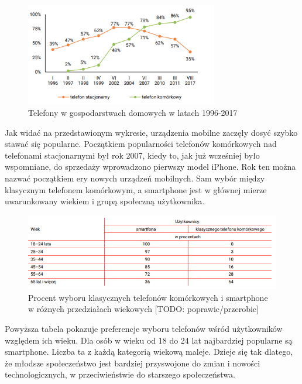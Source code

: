 \documentclass[a4paper,12pt,oneside]{book}
\begin{document}
	\newpage
	\begin{figure}[h]
		\centering
		\includegraphics[width=0.75\textwidth]{grafika/cbos_wykres}
		\caption{Telefony w gospodarstwach domowych w latach 1996-2017}
	\end{figure}

	Jak widać na przedstawionym wykresie, urządzenia mobilne zaczęły dosyć szybko stawać się popularne. Początkiem popularności telefonów komórkowych nad telefonami stacjonarnymi był rok 2007, kiedy to, jak już wcześniej było wspomniane, do sprzedaży wprowadzono pierwszy model iPhone. Rok ten można nazwać początkiem ery nowych urządzeń mobilnych. Sam wybór między klasycznym telefonem komórkowym, a smartphone jest w głównej mierze uwarunkowany wiekiem i grupą społeczną użytkownika.
	
	\begin{figure}[h]
		\centering
		\includegraphics[width=1\textwidth]{grafika/cbos_wykres2}
		\caption{Procent wyboru klasycznych telefonów komórkowych i smartphone w różnych przedziałach wiekowych [TODO: poprawic/przerobic]}
	\end{figure}

	Powyższa tabela pokazuje preferencje wyboru telefonów wśród użytkowników względem ich wieku. Dla osób w wieku od 18 do 24 lat najbardziej popularne są smartphone. Liczba ta z każdą kategorią wiekową maleje. Dzieje się tak dlatego, że młodsze społeczeństwo jest bardziej przyswojone do zmian i nowości technologicznych, w przeciwieństwie do starszego społeczeństwa.
	
\end{document}
